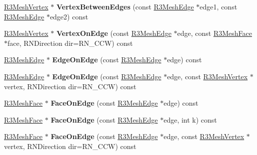 \begin{DoxyCompactItemize}
\item 
\hyperlink{class_r3_mesh_vertex}{R3\+Mesh\+Vertex} $\ast$ {\bfseries Vertex\+Between\+Edges} (const \hyperlink{class_r3_mesh_edge}{R3\+Mesh\+Edge} $\ast$edge1, const \hyperlink{class_r3_mesh_edge}{R3\+Mesh\+Edge} $\ast$edge2) const \hypertarget{class_r3_mesh_a6111c5a8472a8e12df863a46eb2a2ee5}{}\label{class_r3_mesh_a6111c5a8472a8e12df863a46eb2a2ee5}

\item 
\hyperlink{class_r3_mesh_vertex}{R3\+Mesh\+Vertex} $\ast$ {\bfseries Vertex\+On\+Edge} (const \hyperlink{class_r3_mesh_edge}{R3\+Mesh\+Edge} $\ast$edge, const \hyperlink{class_r3_mesh_face}{R3\+Mesh\+Face} $\ast$face, R\+N\+Direction dir=R\+N\+\_\+\+C\+CW) const \hypertarget{class_r3_mesh_acdbfda6170988f29c38ace182d49d060}{}\label{class_r3_mesh_acdbfda6170988f29c38ace182d49d060}

\item 
\hyperlink{class_r3_mesh_edge}{R3\+Mesh\+Edge} $\ast$ {\bfseries Edge\+On\+Edge} (const \hyperlink{class_r3_mesh_edge}{R3\+Mesh\+Edge} $\ast$edge) const \hypertarget{class_r3_mesh_a1667f29a6651fca2a54314bfd4399d51}{}\label{class_r3_mesh_a1667f29a6651fca2a54314bfd4399d51}

\item 
\hyperlink{class_r3_mesh_edge}{R3\+Mesh\+Edge} $\ast$ {\bfseries Edge\+On\+Edge} (const \hyperlink{class_r3_mesh_edge}{R3\+Mesh\+Edge} $\ast$edge, const \hyperlink{class_r3_mesh_vertex}{R3\+Mesh\+Vertex} $\ast$vertex, R\+N\+Direction dir=R\+N\+\_\+\+C\+CW) const \hypertarget{class_r3_mesh_a641e31e5a7a038daa2832a6be0e9a73f}{}\label{class_r3_mesh_a641e31e5a7a038daa2832a6be0e9a73f}

\item 
\hyperlink{class_r3_mesh_face}{R3\+Mesh\+Face} $\ast$ {\bfseries Face\+On\+Edge} (const \hyperlink{class_r3_mesh_edge}{R3\+Mesh\+Edge} $\ast$edge) const \hypertarget{class_r3_mesh_a6bfcad030d1e9227e043cf62a1756c0f}{}\label{class_r3_mesh_a6bfcad030d1e9227e043cf62a1756c0f}

\item 
\hyperlink{class_r3_mesh_face}{R3\+Mesh\+Face} $\ast$ {\bfseries Face\+On\+Edge} (const \hyperlink{class_r3_mesh_edge}{R3\+Mesh\+Edge} $\ast$edge, int k) const \hypertarget{class_r3_mesh_a47b86b975103d6c897478f13704a39f6}{}\label{class_r3_mesh_a47b86b975103d6c897478f13704a39f6}

\item 
\hyperlink{class_r3_mesh_face}{R3\+Mesh\+Face} $\ast$ {\bfseries Face\+On\+Edge} (const \hyperlink{class_r3_mesh_edge}{R3\+Mesh\+Edge} $\ast$edge, const \hyperlink{class_r3_mesh_vertex}{R3\+Mesh\+Vertex} $\ast$vertex, R\+N\+Direction dir=R\+N\+\_\+\+C\+CW) const \hypertarget{class_r3_mesh_a58f999c0f61694e0d4c21683f96c646a}{}\label{class_r3_mesh_a58f999c0f61694e0d4c21683f96c646a}


\end{DoxyCompactItemize}
